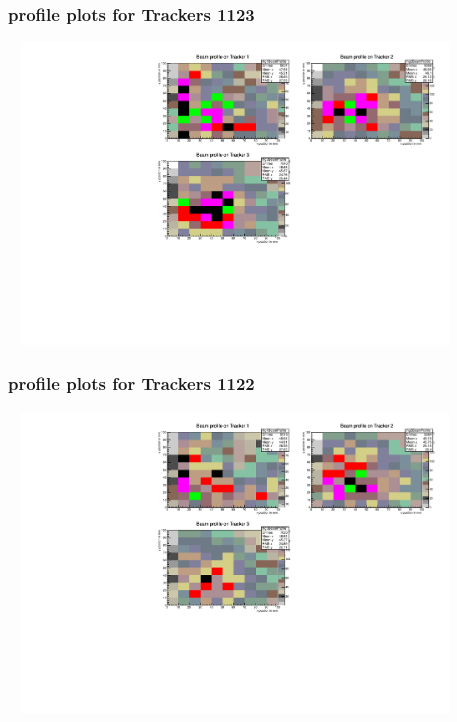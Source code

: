 \documentclass[slidestop,compress,mathserif]{beamer}
\begin{document}
\begin{frame}\frametitle{profile plots for Trackers 1123}
	 \includegraphics[width=12cm,height=8cm]{profile_plots_for_Trackers_1123.pdf}
\end{frame}
\begin{frame}\frametitle{profile plots for Trackers 1122}
	 \includegraphics[width=12cm,height=8cm]{profile_plots_for_Trackers_1122.pdf}
\end{frame}
\end{document}
